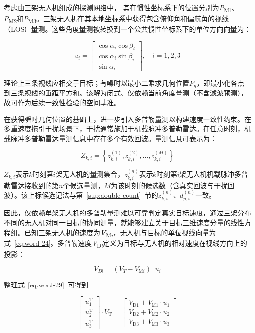 \documentclass[UTF8,a4paper,zihao=-4]{ctexart}
\begin{document}
考虑由三架无人机组成的探测网络中，
其在惯性坐标系下的位置分别为\emph{P}\textsubscript{M1}、\emph{P}\textsubscript{M2}和\emph{P}\textsubscript{M3}。三架无人机在其本地坐标系中获得包含俯仰角和偏航角的视线（LOS）量测。这些角度量测被转换到一个公共惯性坐标系下的单位方向向量为：


\begin{equation}
u_i=\begin{bmatrix}\cos\alpha_i\cos\beta_i\\\cos\alpha_i\sin\beta_i\\\sin\alpha_i\end{bmatrix},\quad i=1,2,3
\label{eq:word-24}
\end{equation}


理论上三条视线应相交于目标；有噪时以最小二乘求几何位置\(P_g\)，即最小化各点到三条视线的垂距平方和。该解为闭式、仅依赖当前角度量测（不含滤波预测），故可作为后续一致性检验的空间基准。

在获得瞬时几何位置的基础上，进一步引入多普勒量测以构建速度一致性约束。在多重速度拖引干扰场景下，干扰通常施加于机载脉冲多普勒雷达。在任意时刻，机载脉冲多普勒雷达量测信息中存在多个有效回波。量测信息可表示为：


\begin{equation}
Z_{k,i}=\left\{z_{k,i}^{(1)},z_{k,i}^{(2)},\ldots,z_{k,i}^{(M)}\right\}
\label{eq:word-26}
\end{equation}


\(Z_{k,i}\)表示\(k\)时刻第\(i\)架无人机的量测集合，\(z_{k,i}^{(n)}\)表示\(k\)时刻第\(i\)架无人机机载脉冲多普勒雷达接收到的第\(n\)个候选量测，\(M\)为该时刻的候选数（含真实回波与干扰回波）。该上标候选记法与第~\ref{sup:double-count}~节的\(z_{k,i}^{(n)}\)、\(d_{p,i}^{(n)}\)一致。

因此，仅依赖单架无人机的多普勒量测难以可靠判定真实目标速度，通过三架分布不同的无人机对同一目标的协同测量，就能够建立关于目标三维速度分量的线性方程组。已知三架无人机的速度为\emph{\textbf{V}}\textsubscript{M\emph{i}}，无人机与目标的单位视线向量为式~\eqref{eq:word-24}。多普勒速度\emph{V}\textsubscript{D\emph{i}}定义为目标与无人机的相对速度在视线方向上的投影：


\begin{equation}
V_{Di}=(V_T-V_{\mathrm Mi})\cdot u_i
\label{eq:word-29}
\end{equation}


整理式~\eqref{eq:word-29}~可得到


\begin{equation}
\begin{bmatrix}u_1^{\mathrm T}\\u_2^{\mathrm T}\\u_3^{\mathrm T}\end{bmatrix}\cdot V_{\mathrm T}=\begin{bmatrix}V_{\mathrm D1}+V_{\mathrm M1}\cdot u_1\\V_{\mathrm D2}+V_{\mathrm M2}\cdot u_2\\V_{\mathrm D3}+V_{\mathrm M3}\cdot u_3\end{bmatrix}
\label{eq:word-30}
\end{equation}
\end{document}
